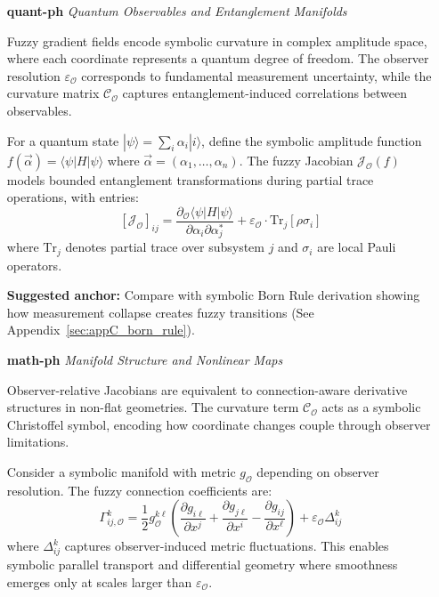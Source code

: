 \begin{itemize}

  \item[\textbf{quant-ph}] \textit{Quantum Observables and Entanglement Manifolds}  
  
  Fuzzy gradient fields encode symbolic curvature in complex amplitude space, where each coordinate represents a quantum degree of freedom. The observer resolution $\varepsilon_{\mathcal{O}}$ corresponds to fundamental measurement uncertainty, while the curvature matrix $\mathcal{C}_{\mathcal{O}}$ captures entanglement-induced correlations between observables.
  
  For a quantum state $|\psi\rangle = \sum_i \alpha_i |i\rangle$, define the symbolic amplitude function $f(\vec{\alpha}) = \langle \psi | H | \psi \rangle$ where $\vec{\alpha} = (\alpha_1, \ldots, \alpha_n)$. The fuzzy Jacobian $\mathcal{J}_{\mathcal{O}}(f)$ models bounded entanglement transformations during partial trace operations, with entries:
  \[
  [\mathcal{J}_{\mathcal{O}}]_{ij} = \frac{\partial_{\mathcal{O}} \langle \psi | H | \psi \rangle}{\partial \alpha_i \partial \alpha_j^*} + \varepsilon_{\mathcal{O}} \cdot \text{Tr}_{j}[\rho \sigma_i]
  \]
  where $\text{Tr}_j$ denotes partial trace over subsystem $j$ and $\sigma_i$ are local Pauli operators.
  
  \textbf{Suggested anchor:} Compare with symbolic Born Rule derivation showing how measurement collapse creates fuzzy transitions (See Appendix~\ref{sec:appC_born_rule}).

  \item[\textbf{math-ph}] \textit{Manifold Structure and Nonlinear Maps}  
  
  Observer-relative Jacobians are equivalent to connection-aware derivative structures in non-flat geometries. The curvature term $\mathcal{C}_{\mathcal{O}}$ acts as a symbolic Christoffel symbol, encoding how coordinate changes couple through observer limitations.
  
  Consider a symbolic manifold with metric $g_{\mathcal{O}}$ depending on observer resolution. The fuzzy connection coefficients are:
  \[
  \Gamma^k_{ij,\mathcal{O}} = \frac{1}{2}g^{k\ell}_{\mathcal{O}} \left( \frac{\partial g_{i\ell}}{\partial x^j} + \frac{\partial g_{j\ell}}{\partial x^i} - \frac{\partial g_{ij}}{\partial x^\ell} \right) + \varepsilon_{\mathcal{O}} \Delta^k_{ij}
  \]
  where $\Delta^k_{ij}$ captures observer-induced metric fluctuations. This enables symbolic parallel transport and differential geometry where smoothness emerges only at scales larger than $\varepsilon_{\mathcal{O}}$.
  

\end{itemize}

